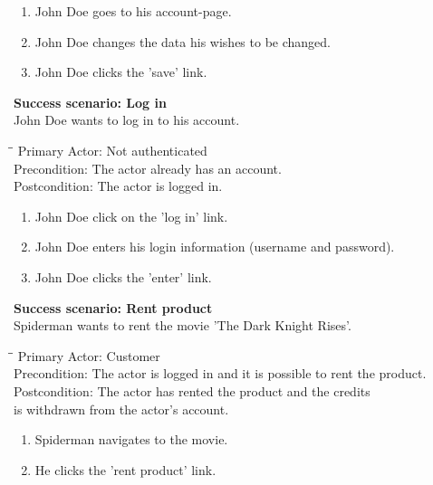 \begin{enumerate} \setlength{\itemsep}{-1mm}
	\item John Doe goes to his account-page.
	\item John Doe changes the data his wishes to be changed.
	\item John Doe clicks the 'save' link.
\end{enumerate}
\vspace{3mm}
\textbf{Success scenario: Log in} \\
John Doe wants to log in to his account. 
\begin{tabbing}
\hspace{5mm}\=\hspace{26mm}\=\kill
\>Primary Actor:\> Not authenticated\\
\>Precondition:\> The actor already has an account.\\
\>Postcondition:\> The actor is logged in.
\end{tabbing}
\begin{enumerate} \setlength{\itemsep}{-1mm}
	\item John Doe click on the 'log in' link.
	\item John Doe enters his login information (username and password).
	\item John Doe clicks the 'enter' link.
\end{enumerate}
\vspace{3mm}
\textbf{Success scenario: Rent product} \\
Spiderman wants to rent the movie 'The Dark Knight Rises'. 
\begin{tabbing}
\hspace{5mm}\=\hspace{26mm}\=\kill
\>Primary Actor:\> Customer\\
\>Precondition:\> The actor is logged in and it is possible to rent the product.\\
\>Postcondition:\> The actor has rented the product and the credits\\ \hspace{85px} is withdrawn from the actor's account.
\end{tabbing}
\begin{enumerate} \setlength{\itemsep}{-1mm}
	\item Spiderman navigates to the movie.
	\item He clicks the 'rent product' link.
\end{enumerate}
\vspace{3mm}
